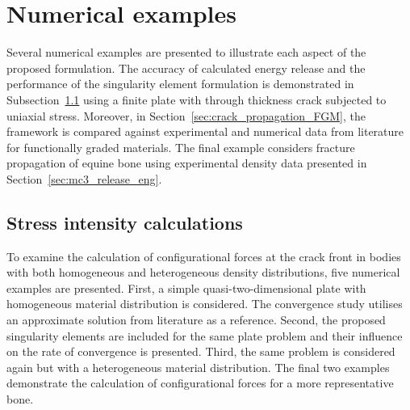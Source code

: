 \documentclass[onecolumn]{svjour3}
\begin{document}
\section{Numerical examples}
\label{sec:numerical_examples}
Several numerical examples are presented to illustrate each aspect of the proposed formulation. 
The accuracy of calculated energy release and the performance of the singularity element formulation is demonstrated in Subsection~\ref{sec:release_energy_rate} using a finite plate with through thickness crack subjected to uniaxial stress. Moreover, in Section~\ref{sec:crack_propagation_FGM}, 
the framework is compared against experimental and numerical data from literature for functionally graded materials.
The final example considers fracture propagation of equine bone using experimental density data presented in Section~\ref{sec:mc3_release_eng}. 
% 
% 
% 

\subsection{Stress intensity calculations}
\label{sec:release_energy_rate}
To examine the calculation of configurational forces at the crack front in bodies with both homogeneous and heterogeneous density distributions, five numerical examples are presented.
First, a simple quasi-two-dimensional plate with homogeneous material distribution is considered.  The convergence study utilises an approximate solution from literature as a reference.
Second, the proposed singularity elements are included for the same plate problem and their influence on the rate of convergence is presented. 
Third, the same problem is considered again but with a heterogeneous material distribution.
The final two examples demonstrate the calculation of configurational forces for a more representative bone.
 
\end{document}
